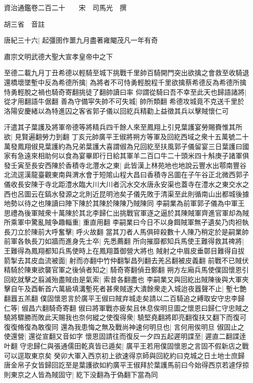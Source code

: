 資治通鑑卷二百二十　　宋　司馬光　撰

胡三省　音註

唐紀三十六|{
	起彊圉作噩九月盡著雍閹茂凡一年有奇}


肅宗文明武德大聖大宣孝皇帝中之下

至德二載九月丁丑希德以輕騎至城下挑戰千里帥百騎開門突出欲擒之會救至收騎退還橋壞墜塹中反為希德所擒|{
	為將者不可恃勇輕脫程千里欲擒蔡希德反為希德所擒恃勇輕脫之禍也騎奇寄翻挑徒了翻帥讀曰率}
仰謂從騎曰吾不幸至此天也歸語諸將|{
	從才用翻語牛倨翻}
善為守備寜失帥不可失城|{
	帥所類翻}
希德攻城竟不克送千里於洛陽安慶緒以為特進囚之客省郭子儀以回紇兵精勸上益徵其兵以擊賊懷仁可

汗遣其子葉護及將軍帝德等將精兵四千餘人來至鳳翔上引見葉護宴勞賜賚惟其所欲|{
	見賢遍翻勞力到翻}
丁亥元帥廣平王俶將朔方等軍及回紇西域之衆十五萬號二十萬發鳳翔俶見葉護約為兄弟葉護大喜謂俶為兄回紇至扶風郭子儀留宴三日葉護曰國家有急遠來相助何以食為宴畢即行日給其軍羊二百口牛二十頭米四十斛庚子諸軍俱發壬寅至長安西陳於香積寺北灃水之東|{
	此皆漢上林苑地也地說云豐水出鄠南豐谷北流逕漢龍臺觀東南與渭水會于短隂山程大昌曰香積寺呂圖在子午谷正北微西郭子儀收長安陳于寺北距澧水臨大川大川者沉水交水唐永安渠也蓋寺在澧水之東交水之西也呂圖云在鎬水發源之北則近昆明池矣子儀先敗于清渠至此則循南山出都城後據地勢以待之也陳讀曰陣下陳於其陳於陳陳乃賊陳同}
李嗣業為前軍郭子儀為中軍王思禮為後軍賊衆十萬陳於其北李歸仁出挑戰官軍逐之逼於其陳賊軍齊進官軍却為賊所乘軍中驚亂賊争趣輜重|{
	重直用翻}
李嗣業曰今日不以身餌賊軍無孑遺矣乃肉袒執長刀立於陳前大呼奮擊|{
	呼火故翻}
當其刀者人馬俱碎殺數十人陳乃稍定於是嗣業帥前軍各執長刀如牆而進身先士卒|{
	先悉薦翻}
所向摧靡都知兵馬使王難得救其禆將|{
	王難得為鳳翔都知兵馬使時上在鳳翔蓋御營大將也}
賊射之中眉皮垂鄣目難得自拔箭掣去其皮血流被面|{
	射而亦翻中竹仲翻掣昌列翻去羌呂翻被皮義翻}
前戰不已賊伏精騎於陳東欲襲官軍之後偵者知之|{
	騎奇寄翻偵丑鄭翻}
朔方左廂兵馬使僕固懷恩引回紇就擊之翦滅殆盡賊由是氣索|{
	索昔各翻盡也}
李嗣業又與回紇出賊陳後與大軍夾擊自午及酉斬首六萬級填溝塹死者甚衆賊遂大潰餘衆走入城迨夜囂聲不止|{
	塹七艶翻囂五羔翻}
僕固懷恩言於廣平王俶曰賊弃城走矣請以二百騎追之縛取安守忠李歸仁等|{
	俶昌六翻騎奇寄翻}
俶曰將軍戰亦疲矣且休息俟明旦圖之懷恩曰歸仁守忠賊之驍將驟勝而敗此天賜我也奈何縱之使復得衆|{
	驍堅堯翻將即亮翻復扶又翻下而復可復復脩復為敢復同}
還為我患悔之無及戰尚神速何明旦也|{
	言何用俟明旦}
俶固止之使還營|{
	還從宣翻又音如字}
懷恩固請往而復反一夕四五起遲明諜至|{
	遲直二翻諜逹叶翻}
守忠歸仁與張通儒田乾真皆已遁矣|{
	廣平王若用僕固懷恩之言固不假新店之戰可以逕取東京矣}
癸卯大軍入西京初上欲速得京師與回紇約曰克城之日土地士庶歸唐金帛子女皆歸回訖至是葉護欲如約廣平王俶拜於葉護馬前曰今始得西京若遽俘掠則東京之人皆為賊固守|{
	紇下没翻為于偽翻下當為同}
